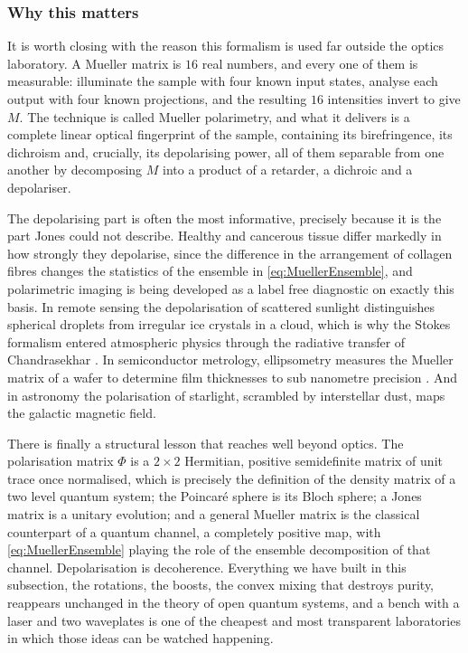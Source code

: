         \subsubsection{Why this matters}

            It is worth closing with the reason this formalism is used far outside the optics laboratory. A Mueller matrix is $16$ real numbers, and every one of them is measurable: illuminate the sample with four known input states, analyse each output with four known projections, and the resulting $16$ intensities invert to give $M$. The technique is called Mueller polarimetry, and what it delivers is a complete linear optical fingerprint of the sample, containing its birefringence, its dichroism and, crucially, its depolarising power, all of them separable from one another by decomposing $M$ into a product of a retarder, a dichroic and a depolariser.

            The depolarising part is often the most informative, precisely because it is the part Jones could not describe. Healthy and cancerous tissue differ markedly in how strongly they depolarise, since the difference in the arrangement of collagen fibres changes the statistics of the ensemble in \ref{eq:MuellerEnsemble}, and polarimetric imaging is being developed as a label free diagnostic on exactly this basis. In remote sensing the depolarisation of scattered sunlight distinguishes spherical droplets from irregular ice crystals in a cloud, which is why the Stokes formalism entered atmospheric physics through the radiative transfer of Chandrasekhar \citep{chandrasekhar1950radiative}. In semiconductor metrology, ellipsometry measures the Mueller matrix of a wafer to determine film thicknesses to sub nanometre precision \citep{azzam1977ellipsometry}. And in astronomy the polarisation of starlight, scrambled by interstellar dust, maps the galactic magnetic field.

            There is finally a structural lesson that reaches well beyond optics. The polarisation matrix $\Phi$ is a $2\times2$ Hermitian, positive semidefinite matrix of unit trace once normalised, which is precisely the definition of the density matrix of a two level quantum system; the Poincaré sphere is its Bloch sphere; a Jones matrix is a unitary evolution; and a general Mueller matrix is the classical counterpart of a quantum channel, a completely positive map, with \ref{eq:MuellerEnsemble} playing the role of the ensemble decomposition of that channel. Depolarisation is decoherence. Everything we have built in this subsection, the rotations, the boosts, the convex mixing that destroys purity, reappears unchanged in the theory of open quantum systems, and a bench with a laser and two waveplates is one of the cheapest and most transparent laboratories in which those ideas can be watched happening.

